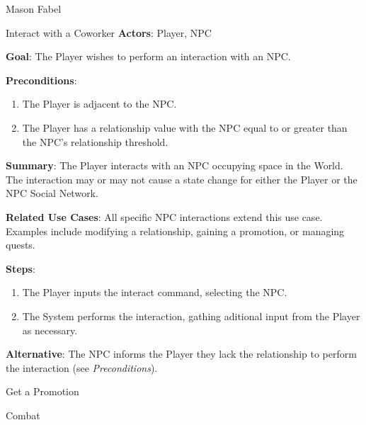 \documentclass[12pt]{report}
\begin{document}
\begin{section}{Mason Fabel}
\begin{subsection}{Interact with a Coworker}
\textbf{Actors}:
Player, NPC

\textbf{Goal}:
The Player wishes to perform an interaction with an NPC.

\textbf{Preconditions}:
\begin{enumerate}
\item The Player is adjacent to the NPC.
\item The Player has a relationship value with the NPC equal to or greater
	than the NPC's relationship threshold.
\end{enumerate}

\textbf{Summary}:
The Player interacts with an NPC occupying space in the World. The
interaction may or may not cause a state change for either the Player or
the NPC Social Network.

\textbf{Related Use Cases}:
All specific NPC interactions extend this use case. Examples include
modifying a relationship, gaining a promotion, or managing quests.

\textbf{Steps}:
\begin{enumerate}
\item The Player inputs the interact command, selecting the NPC.
\item The System performs the interaction, gathing aditional input from the
	Player as necessary.
\end{enumerate}

\textbf{Alternative}:
The NPC informs the Player they lack the relationship to perform the
interaction (see \textit{Preconditions}).
\end{subsection}

\begin{subsection}{Get a Promotion}
\end{subsection}

\begin{subsection}{Combat}
\end{subsection}
\end{section}
\end{document}
